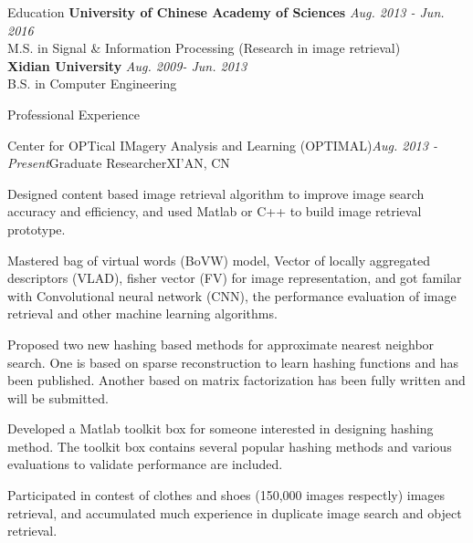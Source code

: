 \documentclass{resume} %
\begin{document}

\begin{rSection}{Education}
{\bf University of Chinese Academy of Sciences} \hfill {\em Aug. 2013 - Jun. 2016} \\
M.S. in  Signal \& Information Processing (Research in image retrieval)\\
{\bf Xidian University} \hfill {\em Aug. 2009- Jun. 2013} \\
B.S. in Computer Engineering
\end{rSection}


\begin{rSection}{Professional Experience}

\begin{rSubsection}{Center for OPTical IMagery Analysis and Learning (OPTIMAL)}{\em Aug. 2013 - Present}{Graduate Researcher}{XI'AN, CN}
\item Designed content based image retrieval algorithm to improve image search accuracy and efficiency, and used Matlab or C++ to build image retrieval prototype.
\item Mastered bag of virtual words (BoVW) model, Vector of locally aggregated descriptors (VLAD), fisher vector (FV) for image representation, and got familar with Convolutional neural network (CNN), the performance evaluation of image retrieval and other machine learning algorithms.
\item Proposed two new hashing based methods for approximate nearest neighbor search. One is based on sparse reconstruction to learn hashing functions and has been published. Another based on matrix factorization has been fully written and will be submitted.
\item Developed a Matlab toolkit box for someone interested in designing hashing method. The toolkit box contains several popular hashing methods and various evaluations to validate performance are included.
\item Participated in contest of clothes and shoes (150,000 images respectly) images retrieval, and accumulated much experience in duplicate image search and object retrieval.
\end{rSubsection}

\end{rSection}
\end{document}
